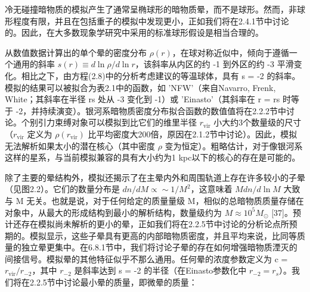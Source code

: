 冷无碰撞暗物质的模拟产生了通常呈椭球形的暗物质晕，而不是球形。然而，非球形程度有限，并且在包括重子的模拟中发现更小，正如我们将在2.4.1节中讨论的。因此，在大多数现象学研究中采用的标准球形假设是相当合理的。

从数值数据计算出的单个晕的密度分布 \( \rho(r) \)，在球对称近似中，倾向于遵循一个通用的斜率 \( s(r) \equiv d\ln\rho/d\ln r \)，该斜率从内区的约 -1 到外区的约 -3 平滑变化。相比之下，由方程(2.8)中的分析考虑建议的等温球体，具有 s = -2 的斜率。模拟的结果可以被拟合为表2.1中的函数，如 'NFW'（来自Navarro, Frenk, White；其斜率在半径 rs 处从 -3 变化到 -1）或 'Einasto'（其斜率在 r = rs 时等于 -2，并持续演变）。银河系暗物质密度分布拟合函数的数值值将在2.2.2节中讨论。个别引力束缚对象可以模拟到比它们的维里半径 \( r_{\text{vir}} \) 小大约3个数量级的尺寸（\( r_{\text{vir}} \) 定义为 \( \rho(r_{\text{vir}}) \) 比平均密度大200倍，原因在2.1.2节中讨论）。因此，模拟无法解析如果太小的潜在核心（其中密度 \( \rho \) 变为恒定）。粗略估计，对于像银河系这样的星系，与当前模拟兼容的具有大小约为1 kpc以下的核心的存在是可能的。

除了主要的晕结构外，模拟还揭示了在主晕内外和周围轨道上存在许多较小的子晕（见图2.2）。它们的数量分布是 \( dn/dM \propto \sim 1/M^2 \)，这意味着 \( M dn/d\ln M \) 大致与 M 无关。也就是说，对于任何给定的质量量级 M，相似的总暗物质质量存储在对象中，从最大的形成结构到最小的解析结构，数量级约为 \( M \approx 10^5 M_\odot \) [37]。预计还存在模拟尚未解析的更小的晕，正如我们将在2.2.5节中讨论的分析论点所预期的。模拟显示，这些子晕具有更高的内部暗物质密度，并且平均来说，比同等质量的独立晕更集中。在6.8.1节中，我们将讨论子晕的存在如何增强暗物质湮灭的间接信号。模拟晕的其他特征似乎不那么通用。任何晕的浓度参数定义为 c = \( r_{\text{vir}}/r_{-2} \)，其中 \( r_{-2} \) 是斜率达到 s = -2 的半径（在Einasto参数化中 \( r_{-2} = r_s \)）。我们将在2.2.5节中讨论最小晕的质量，即微晕的质量：
 


 



